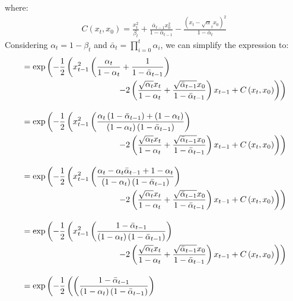 \documentclass{article}
\begin{document}
where:
\begin{gather}
  C\left(x_t, x_0\right) = \frac{x_t^2}{\beta_t} + \frac{\bar{\alpha}_{t-1} x_0^2}{1 - \bar{\alpha}_{t-1}} - \frac{\left(x_t - \sqrt{\alpha}_t x_0\right)^2}{1 - \bar{\alpha}_{t}}
\end{gather}
Considering $\alpha_t = 1 - \beta_t$ and $\bar{\alpha}_t = \prod_{i=0}^{t}{\alpha_i}$, we can simplify the expression to:
\begin{align}
  &= \exp\left(- \frac{1}{2} \left(x_{t-1}^2 \left(\frac{\alpha_t}{1 - \alpha_t} + \frac{1}{1 - \bar{\alpha}_{t-1}}\right) \right. \right. \\
  &\hspace{4cm} \left. \left. - 2\left(\frac{\sqrt{\alpha_t} x_t}{1 - \alpha_t} + \frac{\sqrt{\bar{\alpha}_{t-1}} x_0}{1 - \bar{\alpha}_{t-1}}\right) x_{t-1} + C\left(x_t, x_0\right) \right) \right) \notag \\[10pt]
  &= \exp\left(- \frac{1}{2} \left(x_{t-1}^2 \left(\frac{\alpha_t \left(1 - \bar{\alpha}_{t-1}\right) + \left(1 - \alpha_t\right)}{\left(1 - \alpha_t\right)\left(1 - \bar{\alpha}_{t-1}\right)}\right) \right. \right. \\
  &\hspace{4cm} \left. \left. - 2\left(\frac{\sqrt{\alpha_t} x_t}{1 - \alpha_t} + \frac{\sqrt{\bar{\alpha}_{t-1}} x_0}{1 - \bar{\alpha}_{t-1}}\right) x_{t-1} + C\left(x_t, x_0\right) \right) \right) \notag \\[10pt]
  &= \exp\left(- \frac{1}{2} \left(x_{t-1}^2 \left(\frac{\alpha_t - \alpha_t \bar{\alpha}_{t-1} + 1 - \alpha_t}{\left(1 - \alpha_t\right)\left(1 - \bar{\alpha}_{t-1}\right)}\right) \right. \right. \\
  &\hspace{4cm} \left. \left. - 2\left(\frac{\sqrt{\alpha_t} x_t}{1 - \alpha_t} + \frac{\sqrt{\bar{\alpha}_{t-1}} x_0}{1 - \bar{\alpha}_{t-1}}\right) x_{t-1} + C\left(x_t, x_0\right) \right) \right) \notag \\[10pt]
  &= \exp\left(- \frac{1}{2} \left(x_{t-1}^2 \left(\frac{1 - \bar{\alpha}_{t-1}}{\left(1 - \alpha_t\right)\left(1 - \bar{\alpha}_{t-1}\right)}\right) \right. \right. \\
  &\hspace{4cm} \left. \left. - 2\left(\frac{\sqrt{\alpha_t} x_t}{1 - \alpha_t} + \frac{\sqrt{\bar{\alpha}_{t-1}} x_0}{1 - \bar{\alpha}_{t-1}}\right) x_{t-1} + C\left(x_t, x_0\right) \right) \right) \notag \\[10pt]
  &= \exp\left(- \frac{1}{2} \left( \left(\frac{1 - \bar{\alpha}_{t-1}}{\left(1 - \alpha_t\right)\left(1 - \bar{\alpha}_{t-1}\right)}\right)  \right. \right. \\

\end{align}
\end{document}
